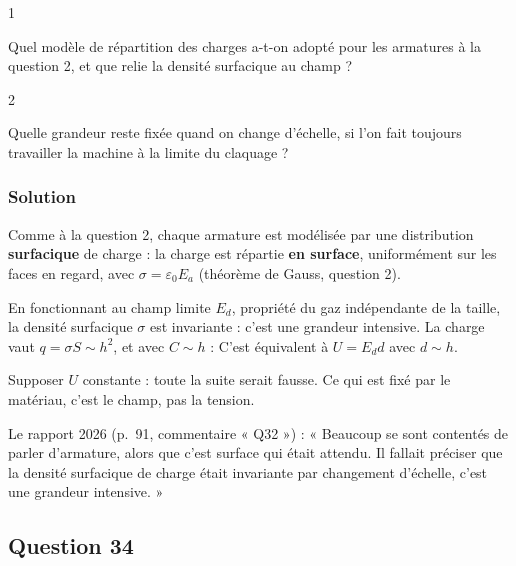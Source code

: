 \documentclass[11pt,a4paper]{article}
\newcommand{\equationajustee}[1]{%
  \sbox{\boiteequation}{$\displaystyle #1$}%
  \ifdim\wd\boiteequation>\linewidth
    \[\resizebox{\linewidth}{!}{\usebox{\boiteequation}}\]%
  \else
    \[#1\]%
  \fi}
\begin{document}
\begin{indication}{1}

Quel modèle de répartition des charges a-t-on adopté pour les armatures à la question 2, et que relie la densité surfacique au champ ?

\end{indication}

\begin{indication}{2}

Quelle grandeur reste fixée quand on change d'échelle, si l'on fait toujours travailler la machine à la limite du claquage ?

\end{indication}

\hypertarget{solution-32}{%
\subsubsection{Solution}\label{solution-32}}

Comme à la question 2, chaque armature est modélisée par une distribution \textbf{surfacique} de charge : la charge est répartie \textbf{en surface}, uniformément sur les faces en regard, avec \(\sigma=\varepsilon_0E_a\) (théorème de Gauss, question 2).

En fonctionnant au champ limite \(E_d\), propriété du gaz indépendante de la taille, la densité surfacique \(\sigma\) est invariante : c'est une grandeur intensive. La charge vaut \(q=\sigma S\sim h^2\), et avec \(C\sim h\) :
\equationajustee{U=\frac{q}{C}\sim\frac{h^2}{h}}
\equationajustee{\boxed{U\sim h}}
C'est équivalent à \(U=E_dd\) avec \(d\sim h\).

\begin{piege}

Supposer \(U\) constante : toute la suite serait fausse. Ce qui est fixé par le matériau, c'est le champ, pas la tension.

\end{piege}

\begin{jury}

Le rapport 2026 (p.~91, commentaire « Q32 ») : « Beaucoup se sont contentés de parler d'armature, alors que c'est surface qui était attendu. Il fallait préciser que la densité surfacique de charge était invariante par changement d'échelle, c'est une grandeur intensive. »

\end{jury}

\hypertarget{question-34}{%
\subsection{Question 34}\label{question-34}}
\end{document}
